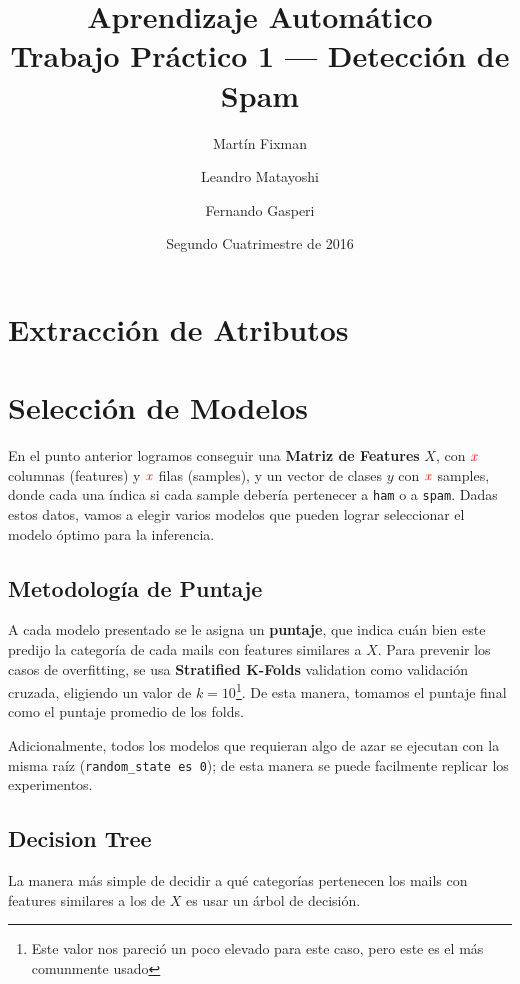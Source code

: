 \documentclass[a4paper, 11pt]{article}
\title{Aprendizaje Automático \\ Trabajo Práctico 1 --- Detección de Spam}
\author{Martín Fixman \and Leandro Matayoshi \and Fernando Gasperi}
\date{Segundo Cuatrimestre de 2016}
\newcommand{\todox}{\(\mathit{\color{red}x}\)}
\newcommand{\ham}{\large{\texttt{ham}}}
\newcommand{\spam}{\large{\texttt{spam}}}
\begin{document}
\maketitle

\newpage

\section{Extracción de Atributos}



\section{Selección de Modelos}

En el punto anterior logramos conseguir una \textbf{Matriz de Features} \( X \), con \todox{} columnas (features) y \todox{} filas (samples), y un vector de clases \( y \) con \todox{} samples, donde cada una índica si cada sample debería pertenecer a \ham{} o a \spam{}. Dadas estos datos, vamos a elegir varios modelos que pueden lograr seleccionar el modelo óptimo para la inferencia.

\subsection{Metodología de Puntaje}

A cada modelo presentado se le asigna un \textbf{puntaje}, que indica cuán bien este predijo la categoría de cada mails con features similares a \( X \). Para prevenir los casos de overfitting, se usa \textbf{Stratified K-Folds} validation como validación cruzada, eligiendo un valor de \( k = 10 \)\footnote{Este valor nos pareció un poco elevado para este caso, pero este es el más comunmente usado}. De esta manera, tomamos el puntaje final como el puntaje promedio de los folds.

Adicionalmente, todos los modelos que requieran algo de azar se ejecutan con la misma raíz (\texttt{random\_state es 0}); de esta manera se puede facilmente replicar los experimentos.

\subsection{Decision Tree}

La manera más simple de decidir a qué categorías pertenecen los mails con features similares a los de \( X \) es usar un árbol de decisión.
\end{document}
